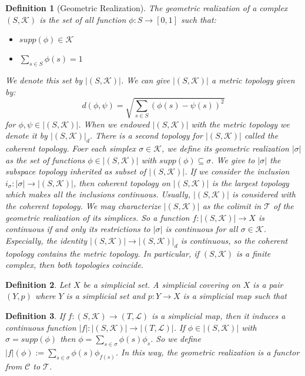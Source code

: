 \documentclass{amsart}
\newtheorem{definition}{Definition}[section]
\begin{document}
\begin{definition}[Geometric Realization]
The geometric realization of a complex $(S,\mathcal{K})$ is the set of all function $\phi\colon S\longrightarrow [0,1]$ such that:
\begin{itemize}
\item $supp(\phi)\in\mathcal{K}$
\item $\sum_{s\in S}\phi(s)=1$
\end{itemize}
We denote this set by $\vert (S,\mathcal{K})\vert$. We can give $\vert (S,\mathcal{K})\vert$ a metric topology given by:
\[
d(\phi,\psi)=\sqrt{\sum_{s\in S}(\phi(s)-\psi(s))^{2}}
\]
for $\phi,\psi\in \vert (S,\mathcal{K})\vert$. When we endowed $\vert (S,\mathcal{K})\vert$ with the metric topology we denote it by $\vert (S,\mathcal{K})\vert_d$. There is a second topology for $\vert (S,\mathcal{K})\vert$ called the coherent topology. Foer each simplex $\sigma\in\mathcal{K}$, we define its geometric realization $\vert\sigma\vert$ as the set of functions $\phi\in \vert (S,\mathcal{K})\vert$ with $supp(\phi)\subseteq \sigma$. We give to $\vert \sigma\vert$ the subspace topology inherited as subset of $\vert (S,\mathcal{K})\vert$. If we consider the inclusion $i_\sigma\colon\vert\sigma\vert\longrightarrow \vert (S,\mathcal{K})\vert$, then coherent topology on $\vert (S,\mathcal{K})\vert$ is the largest topology which makes all the inclusions continuous. Usually, $\vert (S,\mathcal{K})\vert$ is considered with the coherent topology. We may characterize $\vert (S,\mathcal{K})\vert$ as the colimit  in $\mathcal{T}$ of the geometric realization of its simplices. So a function $f\colon\vert (S,\mathcal{K})\vert\longrightarrow X$ is continuous if and only its restrictions to $\vert\sigma\vert$ is continuous for all $\sigma\in\mathcal{K}$. Especially, the identity $\vert (S,\mathcal{K})\vert\longrightarrow \vert (S,\mathcal{K})\vert_d$ is continuous, so the coherent topology contains the metric topology. In particular, if $(S,\mathcal{K})$ is a finite complex, then both topologies coincide.
\end{definition}


\begin{definition}
Let $X$ be a simplicial set. A simplicial covering on $X$ is a pair $(Y,p)$ where $Y$ is a simplicial set and $p\colon Y\longrightarrow X$ is a simplicial map such that
\end{definition}

\begin{definition}
If $f\colon (S,\mathcal{K})\longrightarrow (T,\mathcal{L})$ is a simplicial map, then it induces a continuous function $\vert f\vert\colon \vert(S,\mathcal{K})\vert\longrightarrow \vert(T,\mathcal{L})\vert$. If $\phi\in \vert(S,\mathcal{K})\vert$ with $\sigma=supp(\phi)$ then $\phi=\sum_{s\in\sigma}\phi(s)\phi_s$. So  we define $\vert f\vert (\phi):=\sum_{s\in \sigma}\phi(s)\phi_{f(s)}$. In this way, the geometric realization is a functor from $\mathcal{C}$ to $\mathcal{T}$.
\end{definition}
\end{document}
